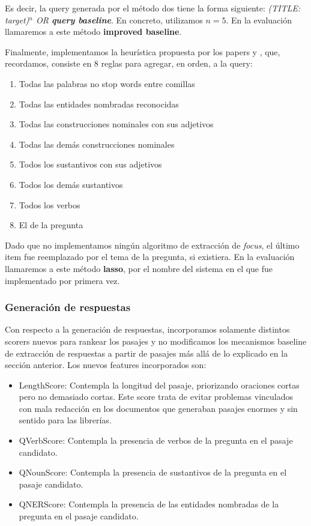 Es decir, la query generada por el método dos tiene la forma siguiente: \textit{(TITLE: target)$^n$ OR \textbf{query baseline}}. En concreto, utilizamos $n=5$. En la evaluación llamaremos a este método \textbf{improved baseline}.

Finalmente, implementamos la heurística propuesta por los papers \cite{QA1} y \cite{QA3}, que, recordamos, consiste en 8 reglas para agregar, en orden, a la query:

\begin{enumerate}
\item Todas las palabras no stop words entre comillas
\item Todas las entidades nombradas reconocidas
\item Todas las construcciones nominales con sus adjetivos
\item Todas las demás construcciones nominales
\item Todos los sustantivos con sus adjetivos
\item Todos los demás sustantivos
\item Todos los verbos
\item El  de la pregunta
\end{enumerate}

Dado que no implementamos ningún algoritmo de extracción de \textit{focus}, el último item fue reemplazado por el tema de la pregunta, si existiera.  En la evaluación llamaremos a este método \textbf{lasso}, por el nombre del sistema en el que fue implementado por primera vez.

\subsubsection{Generación de respuestas}

Con respecto a la generación de respuestas, incorporamos solamente distintos scorers nuevos para rankear los pasajes y no modificamos los mecanismos baseline de extracción de respuestas a partir de pasajes más allá de lo explicado en la sección anterior.
Los nuevos features incorporados son:

\begin{itemize}
\item LengthScore: Contempla la longitud del pasaje, priorizando oraciones cortas pero no demasiado cortas. Este score trata de evitar problemas vinculados con mala redacción en los documentos que generaban pasajes enormes y sin sentido para las librerías.
\item QVerbScore: Contempla la presencia de verbos de la pregunta en el pasaje candidato.
\item QNounScore: Contempla la presencia de sustantivos de la pregunta en el pasaje candidato.
\item QNERScore: Contempla la presencia de las entidades nombradas de la pregunta en el pasaje candidato.
\end{itemize}


